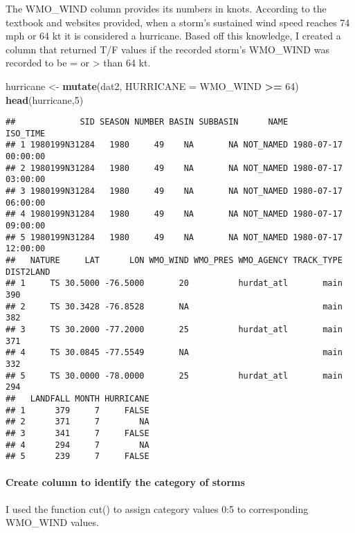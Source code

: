 \documentclass[
]{article}
\newenvironment{Shaded}{\begin{snugshade}}{\end{snugshade}}
\newcommand{\DataTypeTok}[1]{\textcolor[rgb]{0.13,0.29,0.53}{#1}}
\newcommand{\DecValTok}[1]{\textcolor[rgb]{0.00,0.00,0.81}{#1}}
\newcommand{\KeywordTok}[1]{\textcolor[rgb]{0.13,0.29,0.53}{\textbf{#1}}}
\newcommand{\NormalTok}[1]{#1}
\newcommand{\OperatorTok}[1]{\textcolor[rgb]{0.81,0.36,0.00}{\textbf{#1}}}
\newcommand{\StringTok}[1]{\textcolor[rgb]{0.31,0.60,0.02}{#1}}
\begin{document}
The WMO\_WIND column provides its numbers in knots. According to the
textbook and websites provided, when a storm's sustained wind speed
reaches 74 mph or 64 kt it is considered a hurricane. Based off this
knowledge, I created a column that returned T/F values if the recorded
storm's WMO\_WIND was recorded to be = or \textgreater{} than 64 kt.

\begin{Shaded}
\begin{Highlighting}[]
\NormalTok{hurricane <-}\StringTok{ }\KeywordTok{mutate}\NormalTok{(dat2, }\DataTypeTok{HURRICANE =}\NormalTok{ WMO_WIND }\OperatorTok{>=}\StringTok{ }\DecValTok{64}\NormalTok{)}
\KeywordTok{head}\NormalTok{(hurricane,}\DecValTok{5}\NormalTok{)}
\end{Highlighting}
\end{Shaded}

\begin{verbatim}
##             SID SEASON NUMBER BASIN SUBBASIN      NAME            ISO_TIME
## 1 1980199N31284   1980     49    NA       NA NOT_NAMED 1980-07-17 00:00:00
## 2 1980199N31284   1980     49    NA       NA NOT_NAMED 1980-07-17 03:00:00
## 3 1980199N31284   1980     49    NA       NA NOT_NAMED 1980-07-17 06:00:00
## 4 1980199N31284   1980     49    NA       NA NOT_NAMED 1980-07-17 09:00:00
## 5 1980199N31284   1980     49    NA       NA NOT_NAMED 1980-07-17 12:00:00
##   NATURE     LAT      LON WMO_WIND WMO_PRES WMO_AGENCY TRACK_TYPE DIST2LAND
## 1     TS 30.5000 -76.5000       20          hurdat_atl       main       390
## 2     TS 30.3428 -76.8528       NA                           main       382
## 3     TS 30.2000 -77.2000       25          hurdat_atl       main       371
## 4     TS 30.0845 -77.5549       NA                           main       332
## 5     TS 30.0000 -78.0000       25          hurdat_atl       main       294
##   LANDFALL MONTH HURRICANE
## 1      379     7     FALSE
## 2      371     7        NA
## 3      341     7     FALSE
## 4      294     7        NA
## 5      239     7     FALSE
\end{verbatim}

\hypertarget{create-column-to-identify-the-category-of-storms}{%
\paragraph{Create column to identify the category of
storms}\label{create-column-to-identify-the-category-of-storms}}

I used the function cut() to assign category values 0:5 to corresponding
WMO\_WIND values.
\end{document}
